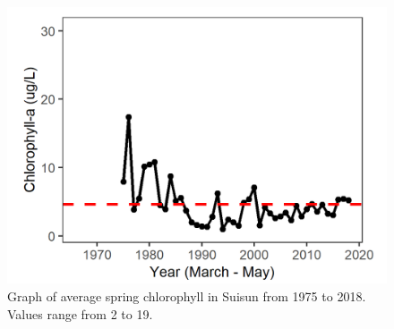 \documentclass[
]{book}
\begin{document}
\begin{panel-grid}
\begin{columns-nocenter}
\begin{column800}
\begin{expand}
\end{expand}

\end{column800}

\begin{column40}

~

\end{column40}

\begin{column800}

\begin{expand}

\begin{figure}
\includegraphics[width=15.25in]{figures/chla_ssspring} \caption{Graph of average spring chlorophyll in Suisun from 1975 to 2018. Values range from 2 to 19.}\label{fig:unnamed-chunk-21}
\end{figure}

\end{expand}

\end{column800}

\begin{column40}

~

\end{column40}

\begin{column800}

\begin{expand}


\end{expand}
\end{column800}
\end{columns-nocenter}
\end{panel-grid}
\end{document}
